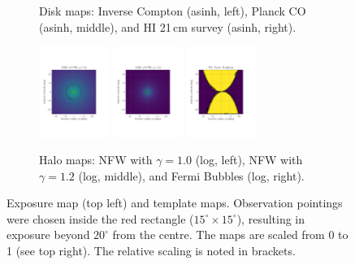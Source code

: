 \documentclass[doublespace,nopageskip]{VTthesis}
\begin{document}
\begin{figure}
\begin{subfigure}[h]{1\textwidth}
		\caption{Disk maps: Inverse Compton (asinh, left), Planck CO (asinh, middle), and HI 21\,cm survey (asinh, right).}\label{fig:IC_map}\label{fig:CO_map}\label{fig:HI_map}
	\end{subfigure}
	\begin{subfigure}[h]{1\textwidth}
		\centering
		\includegraphics[width=0.25\textwidth,trim=0.44in 2.03in 1.29in 2.34in,clip=true]{Figures/511keV/map_DM0_log_grid.pdf}
		\includegraphics[width=0.25\textwidth,trim=0.44in 2.03in 1.29in 2.34in,clip=true]{Figures/511keV/map_DM2_log_grid.pdf}
		\includegraphics[width=0.25\textwidth,trim=0.44in 2.03in 1.29in 2.34in,clip=true]{Figures/511keV/map_FB_log_grid.pdf}
		\caption{Halo maps: NFW with $\gamma=1.0$ (log, left), NFW with $\gamma=1.2$ (log, middle), and Fermi Bubbles (log, right).}\label{fig:DM0_map}\label{fig:DM2_map}\label{fig:FB_map}
	\end{subfigure}
	\caption{Exposure map (top left) and template maps. Observation pointings were chosen inside the red rectangle ($15^{\circ} \times 15^{\circ}$), resulting in exposure beyond $20^{\circ}$ from the centre. The maps are scaled from 0 to 1 (see top right). The relative scaling is noted in brackets.}
\end{figure}
\end{document}
